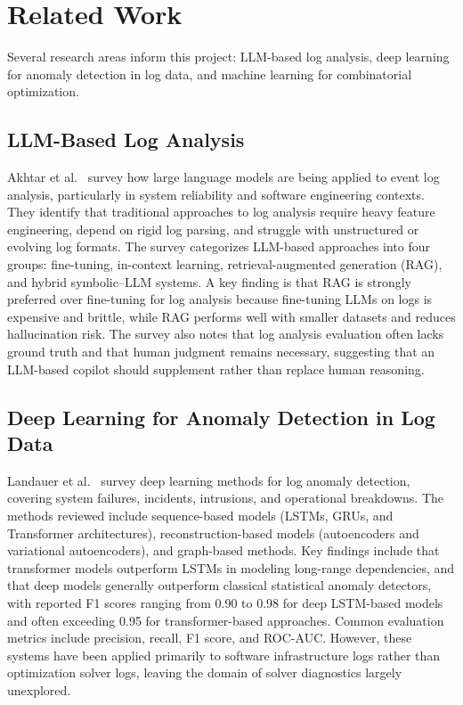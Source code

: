 \documentclass[11pt]{article}
\begin{document}
\section{Related Work}
\label{sec:related_work}

Several research areas inform this project: LLM-based log analysis, deep learning for anomaly detection in log data, and machine learning for combinatorial optimization.

\subsection{LLM-Based Log Analysis}

Akhtar et al.\ \cite{akhtar2025llmbasedeventloganalysis} survey how large language models are being applied to event log analysis, particularly in system reliability and 
software engineering contexts. They identify that traditional approaches to log analysis require heavy feature engineering, depend on rigid log parsing, and struggle with 
unstructured or evolving log formats. The survey categorizes LLM-based approaches into four groups: fine-tuning, in-context learning, retrieval-augmented generation (RAG), 
and hybrid symbolic--LLM systems. A key finding is that RAG is strongly preferred over fine-tuning for log analysis because fine-tuning LLMs on logs is expensive and brittle, 
while RAG performs well with smaller datasets and reduces hallucination risk. The survey also notes that log analysis evaluation often lacks ground truth and that human judgment 
remains necessary, suggesting that an LLM-based copilot should supplement rather than replace human reasoning.

\subsection{Deep Learning for Anomaly Detection in Log Data}

Landauer et al.\ \cite{landauer2023deeplearningloganomaly} survey deep learning methods for log anomaly detection, covering system failures, incidents, intrusions, and operational 
breakdowns. The methods reviewed include sequence-based models (LSTMs, GRUs, and Transformer architectures), reconstruction-based models (autoencoders and variational autoencoders), 
and graph-based methods. Key findings include that transformer models outperform LSTMs in modeling long-range dependencies, and that deep models generally outperform classical 
statistical anomaly detectors, with reported F1 scores ranging from 0.90 to 0.98 for deep LSTM-based models and often exceeding 0.95 for transformer-based approaches. Common 
evaluation metrics include precision, recall, F1 score, and ROC-AUC. However, these systems have been applied primarily to software infrastructure logs rather than optimization solver logs, 
leaving the domain of solver diagnostics largely unexplored.
\end{document}
